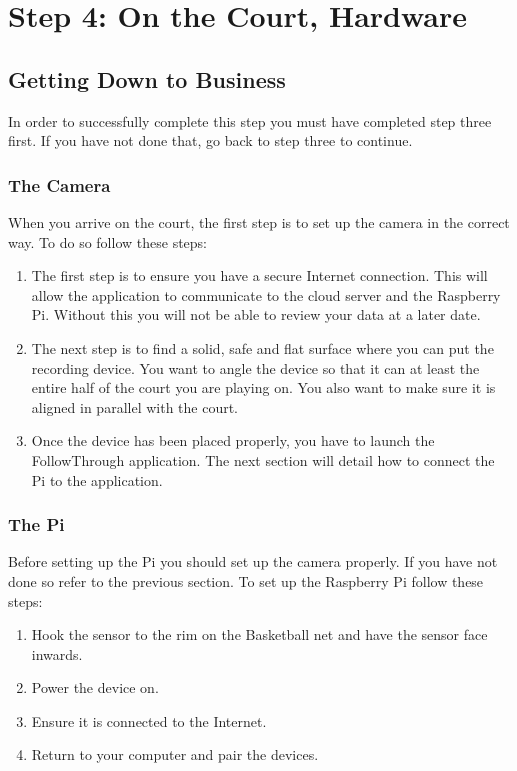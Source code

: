\chapter{Step 4: On the Court, Hardware}

\setlength{\parindent}{0cm}

\section{Getting Down to Business}
In order to successfully complete this step you must have completed step three first. If you have not done that, go back to step three to continue.

\subsection{The Camera}
When you arrive on the court, the first step is to set up the camera in the correct way. To do so follow these steps:

\begin{enumerate}[{1)}]
\item The first step is to ensure you have a secure Internet connection. This will allow the application to communicate to the cloud server and the Raspberry Pi. Without this you will not be able to review your data at a later date.
\item The next step is to find a solid, safe and flat surface where you can put the recording device. You want to angle the device so that it can at least the entire half of the court you are playing on. You also want to make sure it is aligned in parallel with the court.
\item Once the device has been placed properly, you have to launch the FollowThrough application. The next section will detail how to connect the Pi to the application.
\end{enumerate}

\subsection{The Pi}
Before setting up the Pi you should set up the camera properly. If you have not done so refer to the previous section. To set up the Raspberry Pi follow these steps:

\begin{enumerate}[{1)}]
\item Hook the sensor to the rim on the Basketball net and have the sensor face inwards.
\item Power the device on.
\item Ensure it is connected to the Internet.
\item Return to your computer and pair the devices.
\end{enumerate}
